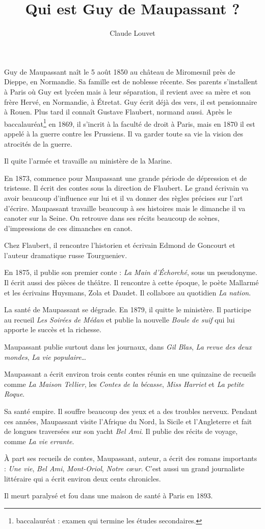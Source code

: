 \documentclass[a5paper,notitlepage]{article}
\author{Claude Louvet}
\title{Qui est Guy de Maupassant ?}
\begin{document}
\maketitle
Guy de Maupassant naît le 5 août 1850 au château de Miromesnil près de Dieppe, en Normandie. Sa famille est de
noblesse récente. Ses parents s'installent à Paris où Guy est lycéen mais à leur séparation, il revient avec sa mère
et son frère Hervé, en Normandie, à Étretat. Guy écrit déjà des vers, il est pensionnaire à Rouen. Plus tard il connaît
Gustave Flaubert, normand aussi. Après le baccalauréat\footnote{baccalauréat : examen qui termine les études
secondaires.} en 1869, il s'incrit à la faculté de droit à Paris, mais en 1870 il est appelé à la guerre contre les
Prussiens. Il va garder toute sa vie la vision des atrocités de la guerre.

Il quite l'armée et travaille au ministère de la Marine.

En 1873, commence pour Maupassant une grande période de dépression et de tristesse. Il écrit des contes sous la direction de
Flaubert. Le grand écrivain va avoir beaucoup d'influence sur lui et il va donner des règles précises sur l'art d'écrire.
Maupassant travaille beaucoup à ses histoires mais le dimanche il va canoter sur la Seine. On retrouve dans ses récits beaucoup
de scènes, d'impressions de ces dimanches en canot.

Chez Flaubert, il rencontre l'historien et écrivain Edmond de Goncourt et l'auteur dramatique russe Tourgueniev.

En 1875, il publie son premier conte : \emph{La Main d'Échorché}, sous un pseudonyme. Il écrit aussi des pièces de théâtre. Il
rencontre à cette époque, le poète Mallarmé et les écrivains Huysmans, Zola et Daudet. Il collabore au quotidien \emph{La nation}.

La santé de Maupassant se dégrade. En 1879, il quitte le ministère. Il participe au recueil \emph{Les Soirées de Médan} et publie
la nouvelle \emph{Boule de suif} qui lui apporte le succès et la richesse.

Maupassant publie surtout dans les journaux, dans \emph{Gil Blas}, \emph{La revue des deux mondes}, \emph{La vie populaire}\ldots{}

Maupassant a écrit environ trois cents contes réunis en une quinzaine de recueils comme \emph{La Maison Tellier}, les \emph{Contes
de la bécasse}, \emph{Miss Harriet} et \emph{La petite Roque}.

Sa santé empire. Il souffre beaucoup des yeux et a des troubles nerveux. Pendant ces années, Maupassant visite l'Afrique du Nord,
la Sicile et l'Angleterre et fait de longues traversées sur son yacht \emph{Bel Ami}. Il publie des récits de voyage, comme
\emph{La vie errante}.

À part ses recueils de contes, Maupassant, auteur, a écrit des romans importants : \emph{Une vie}, \emph{Bel Ami},
\emph{Mont-Oriol}, \emph{Notre cœur}. C'est aussi un grand journaliste littéraire qui a écrit environ deux cents chronicles.

Il meurt paralysé et fou dans une maison de santé à Paris en 1893.
\end{document}
